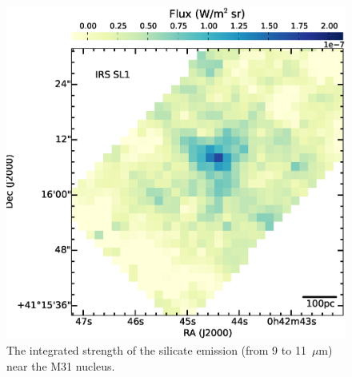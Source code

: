 \begin{figure}
\centering
\includegraphics[scale = 0.3]{./NUCsilicate.eps}
\caption{The integrated strength of the silicate emission (from 9 to 11~$\mu$m) near the M31 nucleus.}
\label{silicate}
\end{figure}



